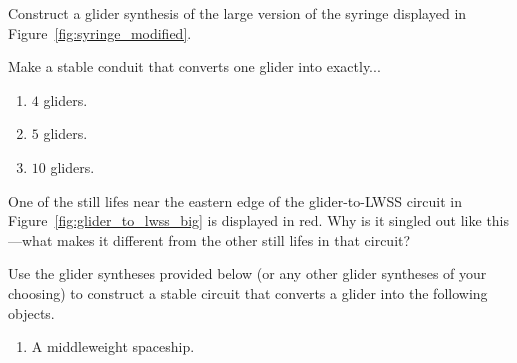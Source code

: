 \begin{multicols}{2}
	
\mfilbreak
	

\begin{problem}\label{exer:syringe_glider_synth}
	Construct a glider synthesis of the large version of the syringe displayed in Figure~\ref{fig:syringe_modified}.
\end{problem}


\mfilbreak


\begin{problem}\label{exer:convert_more_gliders}
	Make a stable conduit that converts one glider into exactly...\smallskip
		
	\begin{enumerate}[label=\bf\color{ocre}(\alph*)]
		\item $4$ gliders.
			
		\item $5$ gliders.
			
		\item $10$ gliders.
	\end{enumerate}
\end{problem}


\mfilbreak


\begin{problem}\label{exer:glider_to_lwss_weird_sl}
	One of the still lifes near the eastern edge of the glider-to-LWSS circuit in Figure~\ref{fig:glider_to_lwss_big} is displayed in red. Why is it singled out like this---what makes it different from the other still lifes in that circuit?
\end{problem}


\mfilbreak


\begin{problem}\label{exer:convert_stable_g_to_spaceships}
	Use the glider syntheses provided below (or any other glider syntheses of your choosing) to construct a stable circuit that converts a glider into the following objects.\smallskip
	
	\begin{enumerate}[label=\bf\color{ocre}(\alph*)]
		\item A middleweight spaceship.
		

\end{enumerate}
\end{problem}
\end{multicols}
